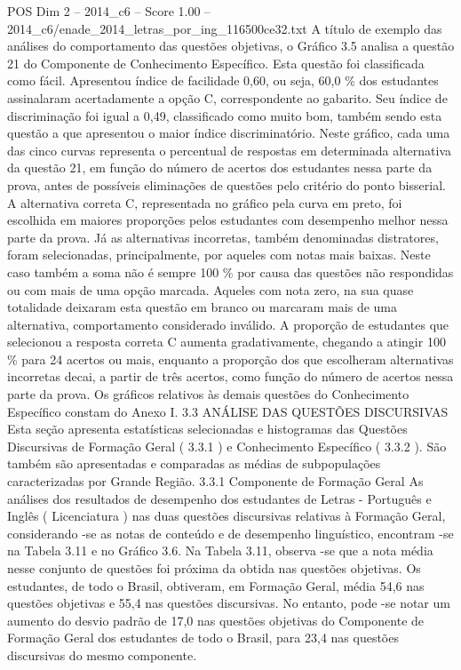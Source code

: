 \begin{textsample}{POS Dim 2 – 2014\_c6 – Score 1.00 – 2014\_c6/enade\_2014\_letras\_por\_ing\_116500ce32.txt}
A título de exemplo das análises do comportamento das questões objetivas, o Gráfico 3.5 analisa a questão 21 do Componente de Conhecimento Específico.
Esta questão foi classificada como fácil.
Apresentou índice de facilidade 0,60, ou seja, 60,0 \% dos estudantes assinalaram acertadamente a opção C, correspondente ao gabarito.
Seu índice de discriminação foi igual a 0,49, classificado como muito bom, também sendo esta questão a que apresentou o maior índice discriminatório.
Neste gráfico, cada uma das cinco curvas representa o percentual de respostas em determinada alternativa da questão 21, em função do número de acertos dos estudantes nessa parte da prova, antes de possíveis eliminações de questões pelo critério do ponto bisserial.
A alternativa correta C, representada no gráfico pela curva em preto, foi escolhida em maiores proporções pelos estudantes com desempenho melhor nessa parte da prova.
Já as alternativas incorretas, também denominadas distratores, foram selecionadas, principalmente, por aqueles com notas mais baixas.
Neste caso também a soma não é sempre 100 \% por causa das questões não respondidas ou com mais de uma opção marcada.
Aqueles com nota zero, na sua quase totalidade deixaram esta questão em branco ou marcaram mais de uma alternativa, comportamento considerado inválido.
A proporção de estudantes que selecionou a resposta correta C aumenta gradativamente, chegando a atingir 100 \% para 24 acertos ou mais, enquanto a proporção dos que escolheram alternativas incorretas decai, a partir de três acertos, como função do número de acertos nessa parte da prova.
Os gráficos relativos às demais questões do Conhecimento Específico constam do Anexo I. 3.3 ANÁLISE DAS QUESTÕES DISCURSIVAS Esta seção apresenta estatísticas selecionadas e histogramas das Questões Discursivas de Formação Geral ( 3.3.1 ) e Conhecimento Específico ( 3.3.2 ).
São também são apresentadas e comparadas as médias de subpopulações caracterizadas por Grande Região. 3.3.1 Componente de Formação Geral As análises dos resultados de desempenho dos estudantes de Letras - Português e Inglês ( Licenciatura ) nas duas questões discursivas relativas à Formação Geral, considerando -se as notas de conteúdo e de desempenho linguístico, encontram -se na Tabela 3.11 e no Gráfico 3.6.
Na Tabela 3.11, observa -se que a nota média nesse conjunto de questões foi próxima da obtida nas questões objetivas.
Os estudantes, de todo o Brasil, obtiveram, em Formação Geral, média 54,6 nas questões objetivas e 55,4 nas questões discursivas.
No entanto, pode -se notar um aumento do desvio padrão de 17,0 nas questões objetivas do Componente de Formação Geral dos estudantes de todo o Brasil, para 23,4 nas questões discursivas do mesmo componente.

\end{textsample}
